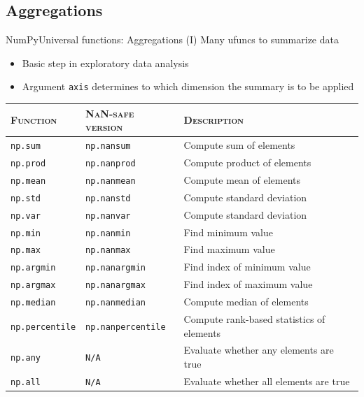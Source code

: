 \documentclass[10pt,compress]{beamer} %
\begin{document}
\subsection{Aggregations}
\begin{frame}{NumPy}{Universal functions: Aggregations (I)}
	Many ufuncs to summarize data
	\begin{itemize}
		\item Basic step in exploratory data analysis
		\item Argument \texttt{axis} determines to which dimension the summary is to be applied
	\end{itemize}

	\smallskip

	\footnotesize{
    \begin{tabular}{lll}\hline
       \textsc{Function} & \textsc{NaN-safe version} & \textsc{Description}\\ \hline
	   \texttt{np.sum} & \texttt{np.nansum} & Compute sum of elements \\
	   \texttt{np.prod} & \texttt{np.nanprod} & Compute product of elements \\
	   \texttt{np.mean} & \texttt{np.nanmean} & Compute mean of elements \\
	   \texttt{np.std} & \texttt{np.nanstd} & Compute standard deviation \\
	   \texttt{np.var} & \texttt{np.nanvar} & Compute standard deviation \\
	   \texttt{np.min} & \texttt{np.nanmin} & Find minimum value \\
	   \texttt{np.max} & \texttt{np.nanmax} & Find maximum value \\
	   \texttt{np.argmin} & \texttt{np.nanargmin} & Find index of minimum value \\
	   \texttt{np.argmax} & \texttt{np.nanargmax} & Find index of maximum value \\
	   \texttt{np.median} & \texttt{np.nanmedian} & Compute median of elements \\
	   \texttt{np.percentile} & \texttt{np.nanpercentile} & Compute rank-based statistics of elements \\
	   \texttt{np.any} & \texttt{N/A} & Evaluate whether any elements are true \\
	   \texttt{np.all} & \texttt{N/A} & Evaluate whether all elements are true \\\hline
    \end{tabular}
	}
\end{frame}
\end{document}
